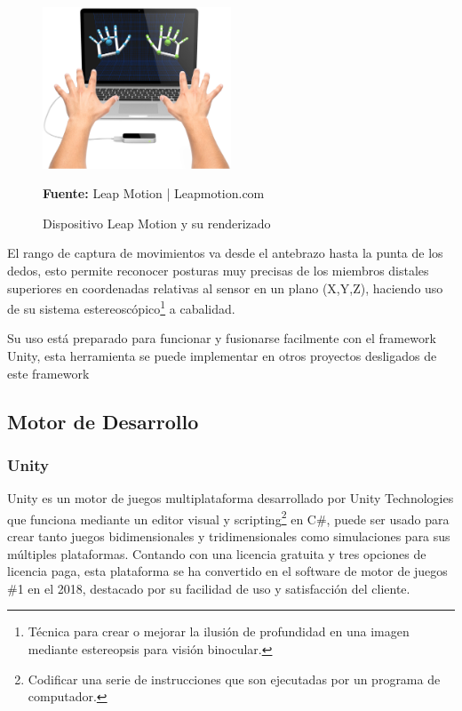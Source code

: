 \begin{figure}[H]
    \centering
    \includegraphics[width=0.5\textwidth]{Anexos/LATEX/chapters/images/leapmotion.jpg}
    \caption{Dispositivo Leap Motion y su renderizado}
    \small{\textbf{Fuente:} Leap Motion | Leapmotion.com}
    \label{LeapOverview}
\end{figure}

El rango de captura de movimientos va desde el antebrazo hasta la punta de los dedos, esto permite reconocer posturas muy precisas de los miembros distales superiores en coordenadas relativas al sensor en un plano (X,Y,Z), haciendo uso de su sistema estereoscópico\footnote{Técnica para crear o mejorar la ilusión de profundidad en una imagen mediante estereopsis para visión binocular.} a cabalidad.

Su uso está preparado para funcionar y fusionarse facilmente con el framework Unity, esta herramienta se puede implementar en otros proyectos desligados de este framework\parencite{LeapMotionInc.2018LeapDeveloper}
\subsection{Motor de Desarrollo}
\subsubsection{Unity}
Unity es un motor de juegos multiplataforma desarrollado por Unity Technologies que funciona mediante un editor visual y scripting\footnote{Codificar una serie de instrucciones que son ejecutadas por un programa de computador.} en C\#, puede ser usado para crear tanto juegos bidimensionales y tridimensionales como simulaciones para sus múltiples plataformas. Contando con una licencia gratuita y tres opciones de licencia paga, esta plataforma se ha convertido en el software de motor de juegos \#1 en el 2018, destacado por su facilidad de uso y satisfacción del cliente.\parencite{G2Crowd2018Best2018}

